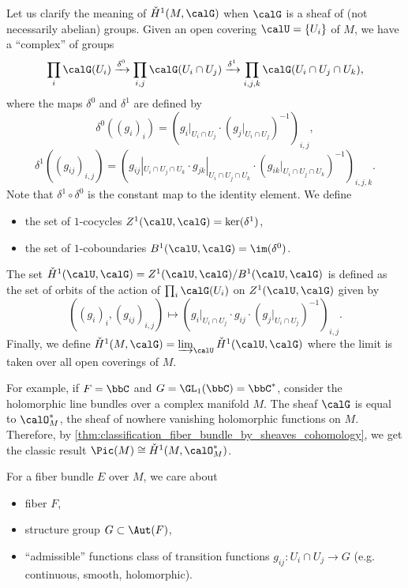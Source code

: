 \begin{remark}\label{rmk:Cech_cohomology_for_sheaves_of_groups}
	Let us clarify the meaning of \(\check{H}^1(M,\calG)\) when \(\calG\) is a sheaf of (not necessarily abelian) groups.
	Given an open covering \(\calU = \{U_i\}\) of \(M\), we have a ``complex'' of groups
	\[
		\prod_i \calG(U_i) \xrightarrow{\delta^0} \prod_{i,j} \calG(U_i \cap U_j) \xrightarrow{\delta^1} \prod_{i,j,k} \calG(U_i \cap U_j \cap U_k),
	\]
	where the maps \(\delta^0\) and \(\delta^1\) are defined by
	\[
		\delta^0((g_i)_i) = (g_i|_{U_i \cap U_j} \cdot (g_j|_{U_i \cap U_j})^{-1})_{i,j},
	\]
	\[
		\delta^1((g_{ij})_{i,j}) = (g_{ij}|_{U_i \cap U_j \cap U_k} \cdot g_{jk}|_{U_i \cap U_j \cap U_k} \cdot (g_{ik}|_{U_i \cap U_j \cap U_k})^{-1})_{i,j,k}.
	\]
	Note that \(\delta^1 \circ \delta^0\) is the constant map to the identity element.
	We define
	\begin{itemize}
		\item the set of \(1\)-cocycles \(Z^1(\calU,\calG) = \ker(\delta^1)\),
		\item the set of \(1\)-coboundaries \(B^1(\calU,\calG) = \im(\delta^0)\).

	\end{itemize}
	The set \(\check{H}^1(\calU,\calG) = Z^1(\calU,\calG) / B^1(\calU,\calG)\) is defined as the set of orbits of the action of \(\prod_i \calG(U_i)\) on \(Z^1(\calU,\calG)\) given by
	\[
		( (g_i)_i , (g_{ij})_{i,j} ) \mapsto ( g_i|_{U_i \cap U_j} \cdot g_{ij} \cdot (g_j|_{U_i \cap U_j})^{-1} )_{i,j}.
	\]
	Finally, we define \(\check{H}^1(M,\calG) = \varinjlim_{\calU} \check{H}^1(\calU,\calG)\) where the limit is taken over all open coverings of \(M\).
\end{remark}

For example, if \(F = \bbC\) and \(G = \GL_1(\bbC) = \bbC^*\), consider the holomorphic line bundles over a complex manifold \(M\).
The sheaf \(\calG\) is equal to \(\calO_M^*\), the sheaf of nowhere vanishing holomorphic functions on \(M\).
Therefore, by \cref{thm:classification_fiber_bundle_by_sheaves_cohomology}, we get the classic result \(\Pic(M) \cong \check{H}^1(M, \calO_M^*)\).

\begin{slogan}\label{slogan:things_of_fiber_bundles_we_care_about}
	For a fiber bundle \(E\) over \(M\), we care about
	\begin{itemize}
		\item fiber \(F\),
		\item structure group \(G \subset \Aut(F)\),
		\item ``admissible'' functions class of transition functions \(g_{ij}: U_i \cap U_j \to G\) (e.g. continuous, smooth, holomorphic).
	\end{itemize}
\end{slogan}


